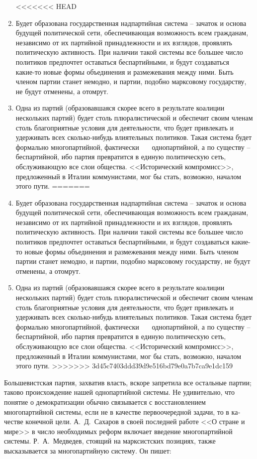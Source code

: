 \documentclass{book}
\begin{document}
\begin{enumerate}
<<<<<<< HEAD
 \item Будет образована государственная надпартийная систе­ма -- зачаток и основа будущей политической сети, обеспечи­вающая возможность всем гражданам, независимо от их партий­ной принадлежности и их взглядов, проявлять политическую активность. При наличии такой системы все большее число по­литиков предпочтет оставаться беспартийными, и будут созда­ваться какие‑то новые формы объединения и размежевания между ними. Быть членом партии станет немодно, и партии, подобно марксовому государству, не будут отменены, а отомрут. 
 \item Одна из партий (образовавшаяся скорее всего в резуль­тате коалиции нескольких партий) будет столь плюралисти­ческой и обеспечит своим членам столь благоприятные условия для деятельности, что будет привлекать и удерживать всех сколько‑нибудь влиятельных политиков. Такая система будет формально многопартийной, фактически    однопартийной, а по существу -- беспартийной, ибо партия превратится в еди­ную политическую сеть, обслуживающую все слои общества. <<Исторический компромисс>>, предложенный в Италии комму­нистами, мог бы стать, возможно, началом этого пути.
=======
 \item Будет образована государственная надпартийная систе­ма -- зачаток и основа будущей политической сети, обеспечи­вающая возможность всем гражданам, независимо от их партий­ной принадлежности и их взглядов, проявлять политическую активность. При наличии такой системы все большее число по­литиков предпочтет оставаться беспартийными, и будут созда­ваться какие-то новые формы объединения и размежевания между ними. Быть членом партии станет немодно, и партии, подобно марксовому государству, не будут отменены, а отомрут. 
 \item Одна из партий (образовавшаяся скорее всего в резуль­тате коалиции нескольких партий) будет столь плюралисти­ческой и обеспечит своим членам столь благоприятные условия для деятельности, что будет привлекать и удерживать всех сколько-нибудь влиятельных политиков. Такая система будет формально многопартийной, фактически    однопартийной, а по существу -- беспартийной, ибо партия превратится в еди­ную политическую сеть, обслуживающую все слои общества. <<Исторический компромисс>>, предложенный в Италии комму­нистами, мог бы стать, возможно, началом этого пути.
>>>>>>> 3d45c7403ddd39d9e516bd79e0a7b7ca9e1dc159
\end{enumerate}

Большевистская партия, захватив власть, вскоре запретила все остальные партии; таково происхождение нашей однопар­тийной системы. Не удивительно, что понятие о демократиза­ции обычно связывается с восстановлением многопартийной системы, если не в качестве первоочередной задачи, то в ка­честве конечной цели. А.~Д.~Сахаров в своей последней работе <<О стране и мире>> в число необходимых реформ включает введение многопартийной системы. Р.~А.~Медведев, стоящий на марксистских позициях, также высказывается за многопартий­ную систему. Он пишет:
\end{document}
